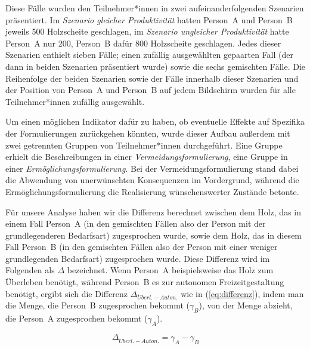 \documentclass[justified,nobib,symmetric,twoside]{tufte-handout}
\begin{document}
Diese Fälle wurden den Teilnehmer*innen in zwei aufeinanderfolgenden Szenarien präsentiert.
Im \textit{Szenario gleicher Produktivität} hatten Person~A und Person~B jeweils 500 Holzscheite geschlagen, im \textit{Szenario ungleicher Produktivität} hatte Person~A nur 200, Person~B dafür 800 Holzscheite geschlagen.
Jedes dieser Szenarien enthielt sieben Fälle; einen zufällig ausgewählten gepaarten Fall (der dann in beiden Szenarien präsentiert wurde) sowie die sechs gemischten Fälle.
Die Reihenfolge der beiden Szenarien sowie der Fälle innerhalb dieser Szenarien und der Position von Person~A und Person~B auf jedem Bildschirm wurden für alle Teilnehmer*innen zufällig ausgewählt.

Um einen möglichen Indikator dafür zu haben, ob eventuelle Effekte auf Spezifika der Formulierungen zurückgehen könnten, wurde dieser Aufbau außerdem mit zwei getrennten Gruppen von Teilnehmer*innen durchgeführt.
Eine Gruppe erhielt die Beschreibungen in einer \textit{Vermeidungsformulierung}, eine Gruppe in einer \textit{Ermöglichungsformulierung}.
Bei der Vermeidungsformulierung stand dabei die Abwendung von unerwünschten Konsequenzen im Vordergrund, während die Ermöglichungsformulierung die Realisierung wünschenswerter Zustände betonte.

Für unsere Analyse haben wir die Differenz berechnet zwischen dem Holz, das in einem Fall Person~A (in den gemischten Fällen also der Person mit der grundlegenderen Bedarfsart) zugesprochen wurde, sowie dem Holz, das in diesem Fall Person~B (in den gemischten Fällen also der Person mit einer weniger grundlegenden Bedarfsart) zugesprochen wurde.
Diese Differenz wird im Folgenden als $\Delta$ bezeichnet.
Wenn Person~A beispielsweise das Holz zum Überleben benötigt, während Person~B es zur autonomen Freizeitgestaltung benötigt, ergibt sich die Differenz $\Delta_{\ddot{U}berl.-Auton.}$  wie in (\ref{eq:differenz}), indem man die Menge, die Person~B zugesprochen bekommt ($\gamma_{B}$), von der Menge abzieht, die Person~A zugesprochen bekommt ($\gamma_{A}$).

\begin{equation}\label{eq:differenz}
   \Delta_{\ddot{U}berl.-Auton.}=\gamma_{A}-\gamma_{B}
\end{equation}
\end{document}
